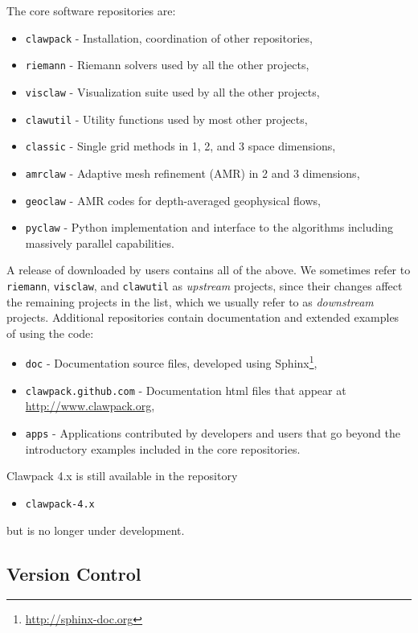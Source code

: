 \vskip 5pt
The core \clawpack software repositories are:
\begin{itemize}
    \item \texttt{clawpack} - Installation, coordination of other repositories,
    \item \texttt{riemann} - Riemann solvers used by all the other projects,
    \item \texttt{visclaw} - Visualization suite used by all the other projects,
    \item \texttt{clawutil} - Utility functions used by most other projects,
    \item \texttt{classic} - Single grid methods in 1, 2, and 3 space
    dimensions,
    \item \texttt{amrclaw} - Adaptive mesh refinement (AMR) in 2 and 3 dimensions,
    \item \texttt{geoclaw} - AMR codes for depth-averaged geophysical flows,
    \item \texttt{pyclaw} - Python implementation and interface to the \clawpack algorithms including massively parallel capabilities.
\end{itemize}
A release of \clawpack downloaded by users contains all of the above.
We sometimes refer to \texttt{riemann}, \texttt{visclaw}, and
\texttt{clawutil} as
\textit{upstream} projects, since their changes affect the
remaining projects in the list, which we usually refer to as
\textit{downstream} projects.
Additional repositories contain documentation and extended examples of
using the code: 
\begin{itemize}
    \item \texttt{doc} - Documentation source files, developed using
Sphinx\footnote{\url{http://sphinx-doc.org}},
    \item \texttt{clawpack.github.com} - Documentation html files that appear
at \url{http://www.clawpack.org},
    \item \texttt{apps} - Applications contributed by developers and users
that go beyond the introductory examples included in the core repositories.
\end{itemize}
Clawpack 4.x is still available in the repository
\begin{itemize}
    \item \texttt{clawpack-4.x}
\end{itemize}
but is no longer under development.


\subsection{Version Control}

